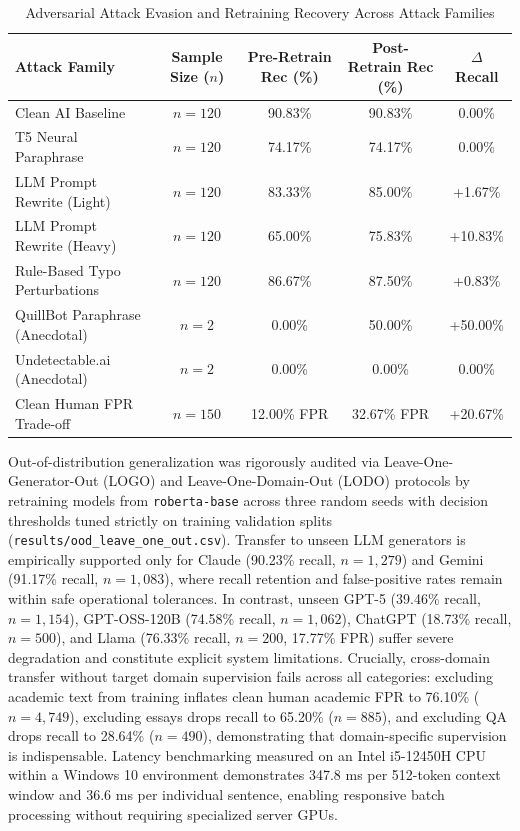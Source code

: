 \documentclass[conference]{IEEEtran}
\begin{document}
\begin{table}[htbp]
\caption{Adversarial Attack Evasion and Retraining Recovery Across Attack Families}
\label{tab_humanizer_resilience}
\centering
\begin{tabular}{lcccc}
\toprule
\textbf{Attack Family} & \textbf{Sample Size ($n$)} & \textbf{Pre-Retrain Rec (\%)} & \textbf{Post-Retrain Rec (\%)} & \textbf{$\Delta$ Recall} \\
\midrule
Clean AI Baseline & $n=120$ & 90.83\% & 90.83\% & 0.00\% \\
T5 Neural Paraphrase & $n=120$ & 74.17\% & 74.17\% & 0.00\% \\
LLM Prompt Rewrite (Light) & $n=120$ & 83.33\% & 85.00\% & +1.67\% \\
LLM Prompt Rewrite (Heavy) & $n=120$ & 65.00\% & 75.83\% & +10.83\% \\
Rule-Based Typo Perturbations & $n=120$ & 86.67\% & 87.50\% & +0.83\% \\
QuillBot Paraphrase (Anecdotal) & $n=2$ & 0.00\% & 50.00\% & +50.00\% \\
Undetectable.ai (Anecdotal) & $n=2$ & 0.00\% & 0.00\% & 0.00\% \\
\midrule
Clean Human FPR Trade-off & $n=150$ & 12.00\% FPR & 32.67\% FPR & +20.67\% \\
\bottomrule
\end{tabular}
\end{table}

Out-of-distribution generalization was rigorously audited via Leave-One-Generator-Out (LOGO) and Leave-One-Domain-Out (LODO) protocols by retraining models from \texttt{roberta-base} across three random seeds with decision thresholds tuned strictly on training validation splits (\texttt{results/ood\_leave\_one\_out.csv}). Transfer to unseen LLM generators is empirically supported only for Claude (90.23\% recall, $n=1,279$) and Gemini (91.17\% recall, $n=1,083$), where recall retention and false-positive rates remain within safe operational tolerances. In contrast, unseen GPT-5 (39.46\% recall, $n=1,154$), GPT-OSS-120B (74.58\% recall, $n=1,062$), ChatGPT (18.73\% recall, $n=500$), and Llama (76.33\% recall, $n=200$, 17.77\% FPR) suffer severe degradation and constitute explicit system limitations. Crucially, cross-domain transfer without target domain supervision fails across all categories: excluding academic text from training inflates clean human academic FPR to 76.10\% ($n=4,749$), excluding essays drops recall to 65.20\% ($n=885$), and excluding QA drops recall to 28.64\% ($n=490$), demonstrating that domain-specific supervision is indispensable. Latency benchmarking measured on an Intel i5-12450H CPU within a Windows 10 environment demonstrates 347.8 ms per 512-token context window and 36.6 ms per individual sentence, enabling responsive batch processing without requiring specialized server GPUs.
\end{document}
